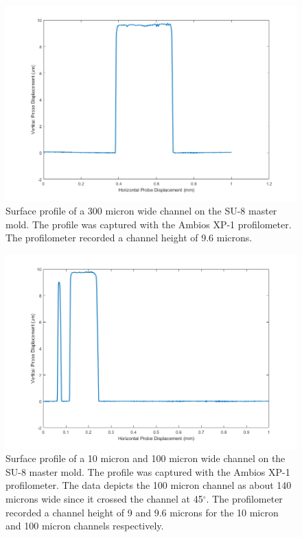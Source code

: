 \begin{figure}[H]
    \centering
    \includegraphics[width=\textwidth]{images/300umWideChannel.png}
    \caption[Surface profile of a 300 micron wide channel on the SU-8 master mold.]{Surface profile of a 300 micron wide channel on the SU-8 master mold. The profile was captured with the Ambios XP-1 profilometer. The profilometer recorded a channel height of 9.6 microns.}
    \label{fig:profilometer_300um_channel}
\end{figure}

\begin{figure}[h]
    \centering
    \includegraphics[width=\textwidth]{images/10umWideAndSidewaysThrough100umWide.png}
    \caption[Surface profile of a 10 micron and 100 micron wide channel on the SU-8 master mold.]{Surface profile of a 10 micron and 100 micron wide channel on the SU-8 master mold. The profile was captured with the Ambios XP-1 profilometer. The data depicts the 100 micron channel as about 140 microns wide since it crossed the channel at 45$^\circ$. The profilometer recorded a channel height of 9 and 9.6 microns for the 10 micron and 100 micron channels respectively.}
    \label{fig:profilometer_10um_channel_100um_sideways}
\end{figure}


